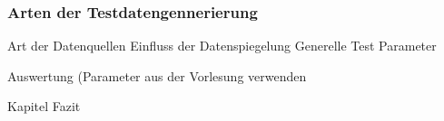 \subsubsection{Arten der Testdatengennerierung}
Art der Datenquellen
Einfluss der Datenspiegelung
Generelle Test Parameter

Auswertung (Parameter aus der Vorlesung verwenden


Kapitel Fazit


